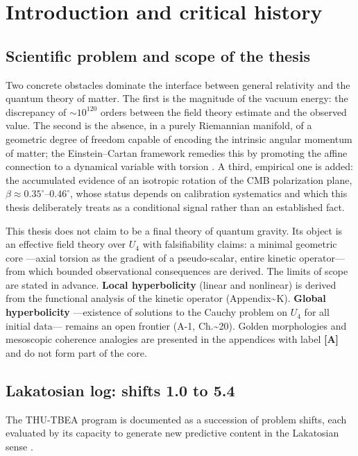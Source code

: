 ﻿\documentclass[11pt,letterpaper]{article}
\begin{document}
\newpage

\section{Introduction and critical history}
\subsection{Scientific problem and scope of the thesis}
Two concrete obstacles dominate the interface between general relativity and the quantum theory of matter. The first is the magnitude of the vacuum energy: the discrepancy of $\sim 10^{120}$ orders between the field theory estimate and the observed value. The second is the absence, in a purely Riemannian manifold, of a geometric degree of freedom capable of encoding the intrinsic angular momentum of matter; the Einstein--Cartan framework remedies this by promoting the affine connection to a dynamical variable with torsion \cite{Hehl1976}. A third, empirical one is added: the accumulated evidence of an isotropic rotation of the CMB polarization plane, $\beta \approx 0{.}35^\circ$--$0{.}46^\circ$, whose status depends on calibration systematics and which this thesis deliberately treats as a conditional signal rather than an established fact.

This thesis does not claim to be a final theory of quantum gravity. Its object is an effective field theory over $U_4$ with falsifiability claims: a minimal geometric core ---axial torsion as the gradient of a pseudo-scalar, entire kinetic operator--- from which bounded observational consequences are derived. The limits of scope are stated in advance. \textbf{Local hyperbolicity} (linear and nonlinear) is derived from the functional analysis of the kinetic operator (Appendix\textasciitilde{}K). \textbf{Global hyperbolicity} ---existence of solutions to the Cauchy problem on $U_4$ for all initial data--- remains an open frontier (A-1, Ch.\textasciitilde{}20). Golden morphologies and mesoscopic coherence analogies are presented in the appendices with label \textbf{[A]} and do not form part of the core.
\subsection{Lakatosian log: shifts 1.0 to 5.4}
The THU-TBEA program is documented as a succession of problem shifts, each evaluated by its capacity to generate new predictive content in the Lakatosian sense \cite{Lakatos1978}.
\end{document}
